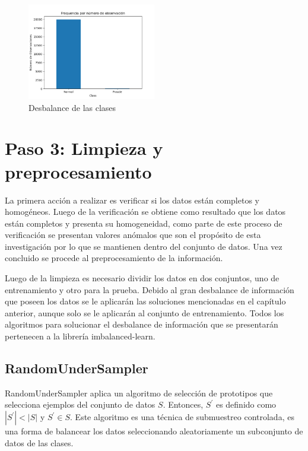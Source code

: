 \begin{figure}[h!]
	\centering
	\includegraphics[width=0.5\textwidth]{"figuras/Fig4"}
	\caption{Desbalance de las clases}
\end{figure}

\section{Paso 3: Limpieza y preprocesamiento}

  La primera acci\'{o}n a realizar es verificar si los datos est\'{a}n completos y homog\'{e}neos. Luego de la verificaci\'{o}n se obtiene como resultado que los datos est\'{a}n completos y presenta su homogeneidad, como parte de este proceso de verificaci\'{o}n se presentan valores an\'{o}malos que son el prop\'{o}sito de esta investigaci\'{o}n por lo que se mantienen dentro del conjunto de datos. Una vez concluido se procede al preprocesamiento de la informaci\'{o}n.
  
  Luego de la limpieza es necesario dividir los datos en dos conjuntos, uno de entrenamiento y otro para la prueba. Debido al gran desbalance de informaci\'{o}n que poseen los datos se le aplicar\'{a}n las soluciones mencionadas en el cap\'{i}tulo anterior, aunque solo se le aplicar\'{a}n al conjunto de entrenamiento. Todos los algoritmos para solucionar el desbalance de informaci\'{o}n que se presentar\'{a}n pertenecen a la librer\'{i}a imbalanced-learn.
  
  \subsection{RandomUnderSampler}

  RandomUnderSampler aplica un algoritmo de selecci\'{o}n de prototipos que selecciona ejemplos del conjunto de datos $S$. Entonces, $S^{'}$ es definido como $|S^{'}|<|S|$ y $S^{'}\in S$. Este algoritmo es una t\'{e}cnica de submuestreo controlada, es una forma de balancear los datos seleccionando aleatoriamente un subconjunto de datos de las clases.
  
